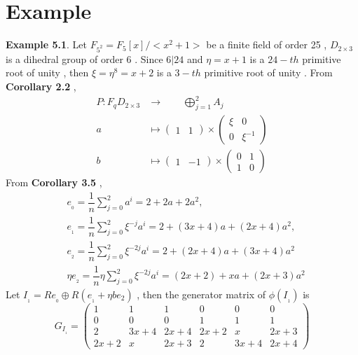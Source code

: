 \documentclass{article}
\begin{document}
\section{Example}
\textbf{Example 5.1}. Let $F_{5^{\scriptscriptstyle2}}=F_5[x]/<x^{\scriptscriptstyle2}+1>$ be a finite field of order 25 , $D_{2\times3}$ is a dihedral group of order 6 . Since $6|24$ and $\eta=x+1$ is a $24-th$ primitive root of unity , then $\xi=\eta^8=x+2$ is a $3-th$ primitive root of unity . From \textbf{Corollary 2.2} , 
    \begin{align*}
        P:F_qD_{2\times3}&\longrightarrow\qquad\mathop{\bigoplus}\limits_{j=1}^{2}A_j\\
        a\quad&\longmapsto\begin{pmatrix}
            1&1
        \end{pmatrix}
        \times
        \begin{pmatrix}
            \xi&0\\
            0&\xi^{\scriptscriptstyle-1}
        \end{pmatrix}\\
        b\quad&\longmapsto\begin{pmatrix}
            1&-1
        \end{pmatrix}
        \times
        \begin{pmatrix}
            0&1\\
            1&0
        \end{pmatrix}
    \end{align*}
From \textbf{Corollary 3.5} , 
\begin{align*}
    &e_{_0}=\dfrac{1}{n}\sum\limits_{j=0}^{2}a^{\scriptscriptstyle i}=2+2a+2a^{\scriptscriptstyle2},\\
    &e_{_1}=\dfrac{1}{n}\sum\limits_{j=0}^{2}\xi^{\scriptscriptstyle-j}a^{\scriptscriptstyle i}=2+(3x+4)a+(2x+4)a^{\scriptscriptstyle2},\\
    &e_{_2}=\dfrac{1}{n}\sum\limits_{j=0}^{2}\xi^{\scriptscriptstyle-2j}a^{\scriptscriptstyle i}=2+(2x+4)a+(3x+4)a^{\scriptscriptstyle2}\\
    &\eta e_{_2}=\dfrac{1}{n}\eta\sum\limits_{j=0}^{2}\xi^{\scriptscriptstyle-2j}a^{\scriptscriptstyle i}=(2x+2)+xa+(2x+3)a^{\scriptscriptstyle2}
\end{align*}
Let $I_{_1}=Re_{_0}\oplus R(e_{_1}+\eta be{_2})$ , then the generator matrix of $\phi(I_{_1})$ is 
\begin{equation*}
    G_{I_{_1}}=\begin{pmatrix}
        1&1&1&0&0&0\\
        0&0&0&1&1&1\\
        2&3x+4&2x+4&2x+2&x&2x+3\\
        2x+2&x&2x+3&2&3x+4&2x+4
    \end{pmatrix}
\end{equation*}
\end{document}
